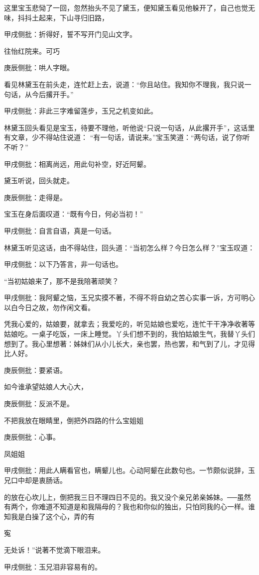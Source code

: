 \begin{parag}
    这里宝玉悲恸了一回，忽然抬头不见了黛玉，便知黛玉看见他躲开了，自己也觉无味，抖抖土起来，下山寻归旧路，\begin{note}甲戌侧批：折得好，誓不写开门见山文字。\end{note}往怡红院来。可巧\begin{note}庚辰侧批：哄人字眼。\end{note}看见林黛玉在前头走，连忙赶上去，说道：“你且站住。我知你不理我，我只说一句话，从今后撂开手。”\begin{note}甲戌侧批：非此三字难留莲步，玉兄之机变如此。\end{note}林黛玉回头看见是宝玉，待要不理他，听他说“只说一句话，从此撂开手”，这话里有文章，少不得站住说道： “有一句话，请说来。”宝玉笑道：“两句话，说了你听不听？”\begin{note}甲戌侧批：相离尚远，用此句补空，好近阿颦。\end{note}黛玉听说，回头就走。\begin{note}庚辰侧批：走得是。\end{note}宝玉在身后面叹道：“既有今日，何必当初！”\begin{note}甲戌侧批：自言自语，真是一句话。\end{note}林黛玉听见这话，由不得站住，回头道：“当初怎么样？今日怎么样？”宝玉叹道：\begin{note}甲戌侧批：以下乃答言，非一句话也。\end{note}“当初姑娘来了，那不是我陪著顽笑？\begin{note}甲戌侧批：我阿颦之恼，玉兄实摸不著，不得不将自幼之苦心实事一诉，方可明心以白今日之故，勿作闲文看。\end{note}凭我心爱的，姑娘要，就拿去；我爱吃的，听见姑娘也爱吃，连忙干干净净收著等姑娘吃。一桌子吃饭，一床上睡觉。丫头们想不到的，我怕姑娘生气，我替丫头们想到了。我心里想著：姊妹们从小儿长大，亲也罢，热也罢，和气到了儿，才见得比人好。\begin{note}庚辰侧批：要紧语。\end{note}如今谁承望姑娘人大心大，\begin{note}庚辰侧批：反派不是。\end{note}不把我放在眼睛里，倒把外四路的什么宝姐姐\begin{note}庚辰侧批：心事。\end{note}凤姐姐\begin{note}甲戌侧批：用此人瞒看官也，瞒颦儿也。心动阿颦在此数句也。一节颇似说辞，玉兄口中却是衷肠话。\end{note}的放在心坎儿上，倒把我三日不理四日不见的。我又没个亲兄弟亲姊妹。──虽然有两个，你难道不知道是和我隔母的？我也和你似的独出，只怕同我的心一样。谁知我是白操了这个心，弄的有\begin{note}寃\end{note}无处诉！”说著不觉滴下眼泪来。\begin{note}甲戌侧批：玉兄泪非容易有的。\end{note}
\end{parag}


